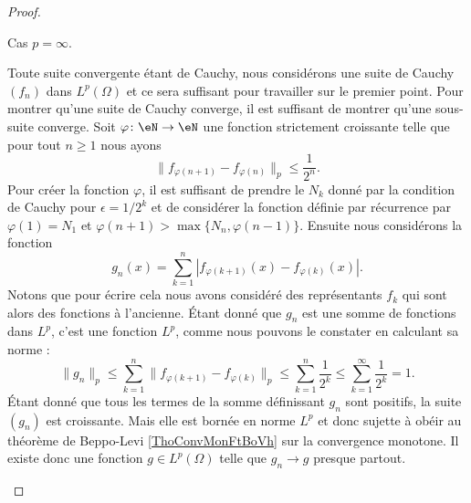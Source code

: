 \begin{proof}
\begin{subproof}
    \item[Cas \( p=\infty\).]

        Toute suite convergente étant de Cauchy, nous considérons une suite de Cauchy \( (f_n)\) dans \( L^p(\Omega)\) et ce sera suffisant pour travailler sur le premier point. Pour montrer qu'une suite de Cauchy converge, il est suffisant de montrer qu'une sous-suite converge. Soit \( \varphi\colon \eN\to \eN\) une fonction strictement croissante telle que pour tout \( n\geq 1\) nous ayons
        \begin{equation}
            \| f_{\varphi(n+1)}-f_{\varphi(n)} \|_p\leq \frac{1}{ 2^{n} }.
        \end{equation}
        Pour créer la fonction \( \varphi\), il est suffisant de prendre le \( N_k\) donné par la condition de Cauchy pour \( \epsilon=1/2^k\) et de considérer la fonction définie par récurrence par \( \varphi(1)=N_1\) et \( \varphi(n+1)>\max\{ N_n,\varphi(n-1) \}\). Ensuite nous considérons la fonction
        \begin{equation}
            g_n(x)=\sum_{k=1}^n| f_{\varphi(k+1)}(x)-f_{\varphi(k)}(x) |.
        \end{equation}
        Notons que pour écrire cela nous avons considéré des représentants \( f_k\) qui sont alors des fonctions à l'ancienne. Étant donné que \( g_n\) est une somme de fonctions dans \( L^p\), c'est une fonction \( L^p\), comme nous pouvons le constater en calculant sa norme :
        \begin{equation}
            \| g_n \|_p\leq \sum_{k=1}^n\| f_{\varphi(k+1)}-f_{\varphi(k)} \|_p\leq\sum_{k=1}^n\frac{1}{ 2^k }\leq\sum_{k=1}^{\infty}\frac{1}{ 2^k }=1.
        \end{equation}
        Étant donné que tous les termes de la somme définissant \( g_n\) sont positifs, la suite \( (g_n)\) est croissante. Mais elle est bornée en norme \( L^p\) et donc sujette à obéir au théorème de Beppo-Levi \ref{ThoConvMonFtBoVh} sur la convergence monotone. Il existe donc une fonction \( g\in L^p(\Omega)\) telle que \( g_n\to g\) presque partout.


\end{subproof}
\end{proof}
